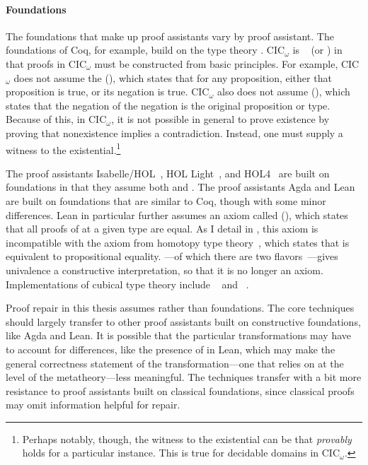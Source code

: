 \paragraph{Foundations}
The foundations that make up proof assistants vary by proof assistant.
The foundations of Coq, for example, build on the  type theory .
CIC$_{\omega}$ is ~\cite{Heyting1956} (or ) in that
proofs in CIC$_{\omega}$ must be constructed from basic principles.
For example, CIC$_{\omega}$ does not assume the  (),
which states that for any proposition, either that proposition is true, or its negation is true.
CIC$_{\omega}$ also does not assume  (),
which states that the negation of the negation is the original proposition or type.
Because of this, in CIC$_{\omega}$, it is not possible in general to prove existence by proving that 
nonexistence implies a contradiction.
Instead, one must supply a witness to the existential.\footnote{Perhaps notably, though, the witness to the existential can be that 
 \emph{provably} holds for a particular instance. This is true for decidable domains in CIC$_{\omega}$.} 

The proof assistants Isabelle/HOL~\cite{isabelle}, HOL Light~\cite{hollight}, and HOL4~\cite{hol4-interact} are built on  foundations
in that they assume both  and .
The proof assistants Agda and Lean are built on  foundations that are similar to Coq, though with some minor differences.
Lean in particular further assumes an axiom called  (), which states that all proofs of
 at a given type are equal.
As I detail in , this axiom is incompatible with the  axiom from homotopy type theory~\cite{univalent2013homotopy},
which states that  is equivalent to propositional equality.
---of which there are two flavors~\cite{cohen2016cubical, angiuli2017cubical}---gives univalence a constructive interpretation,
so that it is no longer an axiom.
Implementations of cubical type theory include ~\cite{redprl} and ~\cite{cubical-agda}.

Proof repair in this thesis assumes  rather than  foundations.
The core techniques should largely transfer to other proof assistants built on constructive foundations, like Agda and Lean.
It is possible that the particular transformations may have to account for differences, like the presence of  in Lean,
which may make the general correctness statement of the \toolnamec transformation---one that relies on  at the level of the metatheory---less meaningful.
The techniques transfer with a bit more resistance to proof assistants built on classical foundations,
since classical proofs may omit information helpful for repair.

